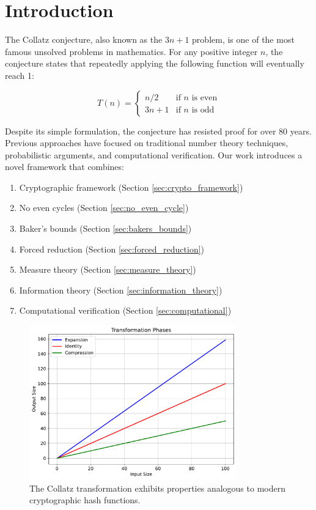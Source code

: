 \section{Introduction}\label{sec:introduction}

The Collatz conjecture, also known as the $3n+1$ problem, is one of the most famous unsolved problems in mathematics. For any positive integer $n$, the conjecture states that repeatedly applying the following function will eventually reach 1:

\[
T(n) = \begin{cases}
n/2 & \text{if } n \text{ is even} \\
3n + 1 & \text{if } n \text{ is odd}
\end{cases}
\]

Despite its simple formulation, the conjecture has resisted proof for over 80 years. Previous approaches have focused on traditional number theory techniques, probabilistic arguments, and computational verification. Our work introduces a novel framework that combines:

\begin{enumerate}
\item Cryptographic framework (Section \ref{sec:crypto_framework})
\item No even cycles (Section \ref{sec:no_even_cycle})
\item Baker's bounds (Section \ref{sec:bakers_bounds})
\item Forced reduction (Section \ref{sec:forced_reduction})
\item Measure theory (Section \ref{sec:measure_theory})
\item Information theory (Section \ref{sec:information_theory})
\item Computational verification (Section \ref{sec:computational})
\end{enumerate}

\begin{figure}[h]
\centering
\includegraphics[width=0.8\textwidth]{py_visuals/figures/transformation_phases.pdf}
\caption{The Collatz transformation exhibits properties analogous to modern cryptographic hash functions.}
\label{fig:transformation_phases}
\end{figure}

